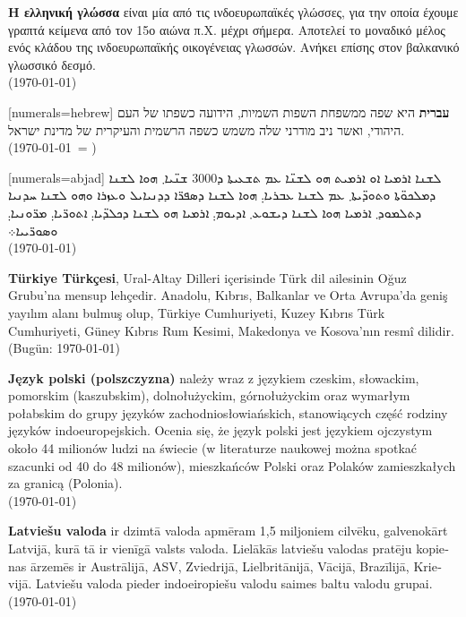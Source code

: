 \documentclass[a4paper]{article}
\begin{document}
\begin{greek}
\textbf{Η ελληνική γλώσσα} είναι μία από τις ινδοευρωπαϊκές γλώσσες, για την
οποία έχουμε γραπτά κείμενα από τον 15ο αιώνα π.Χ. μέχρι σήμερα. Αποτελεί το
μοναδικό μέλος ενός κλάδου της ινδοευρωπαϊκής οικογένειας γλωσσών. Ανήκει
επίσης στον βαλκανικό γλωσσικό δεσμό.\\	
(\today) 
\end{greek}


\begin{hebrew}[numerals=hebrew]
\textbf{עברית} היא שפה ממשפחת השפות השמיות, הידועה כשפתו של העם היהודי, ואשר ניב מודרני שלה משמש כשפה הרשמית והעיקרית של מדינת ישראל. \\
(\today\ = \hebrewtoday)
\end{hebrew}

\begin{syriac}[numerals=abjad]
ܠܫܢܐ ܐܪܡܝܐ ܐܘ ܐܪܡܝܬ ܗܘ ܠܫܢ̈ܐ ܥܡ ܬܫܥܝܬܐ ܕ\textrm{3000} ܫܢ̈ܝܐ܂ ܗܘܐ ܠܫܢܐ ܕܡܠܟܘ̈ܬܐ ܘܬܘܕ̈ܝܬܐ܂ ܥܡ ܠܫܢܐ ܥܒܪܝܐ܄ ܗܘܐ ܠܫܢܐ ܕܣܦܪ̈ܐ ܕܕܢܝܐܝܠ ܘܥܙܪܐ ܘܗܘ ܠܫܢܐ ܚܕܢܝܐ ܕܬܠܡܘܕ܂ ܐܪܡܝܐ ܗܘܐ ܠܫܢܐ ܕܝܫܘܥ܂ ܐܕܝܘܡ܄ ܐܪܡܝܐ ܗܘ ܠܫܢܐ ܕܟܠܕ̈ܝܐ܄ ܐܬܘܪ̈ܝܐ܄ ܡܪ̈ܘܢܝܐ܄ ܘܣܘܪ̈ܝܝܐ܀ \\
(\today)
\end{syriac}

\begin{turkish}
\textbf{Türkiye Türkçesi}, Ural-Altay Dilleri içerisinde Türk dil ailesinin Oğuz Grubu'na mensup lehçedir. Anadolu, Kıbrıs, Balkanlar ve Orta Avrupa'da geniş yayılım alanı bulmuş olup, Türkiye Cumhuriyeti, Kuzey Kıbrıs Türk Cumhuriyeti, Güney Kıbrıs Rum Kesimi, Makedonya ve Kosova'nın resmî dilidir. \\
(Bugün: \today)
\end{turkish}

\begin{polish}
\textbf{Język polski (polszczyzna)} należy wraz z językiem czeskim, słowackim, pomorskim (kaszubskim), dolnołużyckim, górnołużyckim oraz wymarłym połabskim do grupy języków zachodniosłowiańskich, stanowiących część rodziny języków indoeuropejskich. Ocenia się, że język polski jest językiem ojczystym około 44 milionów ludzi na świecie (w literaturze naukowej można spotkać szacunki od 40 do 48 milionów), mieszkańców Polski oraz Polaków zamieszkałych za granicą (Polonia).\\
(\today)
\end{polish}

\begin{latvian} 
\textbf{Latviešu valoda} ir dzimtā valoda apmēram 1,5 miljoniem cilvēku, galvenokārt Latvijā, kurā tā ir vienīgā valsts valoda. Lielākās latviešu valodas pratēju kopienas ārzemēs ir Austrālijā, ASV, Zviedrijā, Lielbritānijā, Vācijā, Brazīlijā, Krievijā. Latviešu valoda pieder indoeiropiešu valodu saimes baltu valodu grupai.\\
(\today)
\end{latvian}
\end{document}
